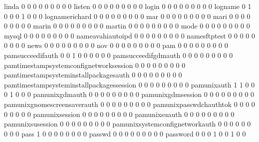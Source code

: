 \documentclass[compress,8pt]{beamer}
\begin{document}
\begin{frame}
\begin{Schunk}
  linda                                      0   0   0   0   0   0   0   0   0
  listen                                     0   0   0   0   0   0   0   0   0
  login                                      0   0   0   0   0   0   0   0   0
  logname                                    0   1   0   0   0   1   0   0   0
  lognamerichard                             0   0   0   0   0   0   0   0   0
  mar                                        0   0   0   0   0   0   0   0   0
  mari                                       0   0   0   0   0   0   0   0   0
  marin                                      0   0   0   0   0   0   0   0   0
  martin                                     0   0   0   0   0   0   0   0   0
  mode                                       0   0   0   0   0   0   0   0   0
  mysql                                      0   0   0   0   0   0   0   0   0
  nameavahiautoipd                           0   0   0   0   0   0   0   0   0
  namesftptest                               0   0   0   0   0   0   0   0   0
  news                                       0   0   0   0   0   0   0   0   0
  nov                                        0   0   0   0   0   0   0   0   0
  pam                                        0   0   0   0   0   0   0   0   0
  pamsucceedifauth                           0   0   1   0   0   0   0   0   0
  pamsucceedifgdmauth                        0   0   0   0   0   0   0   0   0
  pamtimestampsystemconfignetworksession     0   0   0   0   0   0   0   0   0
  pamtimestampsysteminstallpackagesauth      0   0   0   0   0   0   0   0   0
  pamtimestampsysteminstallpackagessession   0   0   0   0   0   0   0   0   0
  pamunixauth                                1   1   0   0   0   1   0   0   0
  pamunixgdmauth                             0   0   0   0   0   0   0   0   0
  pamunixgdmsession                          0   0   0   0   0   0   0   0   0
  pamunixgnomescreensaverauth                0   0   0   0   0   0   0   0   0
  pamunixpasswdchauthtok                     0   0   0   0   0   0   0   0   0
  pamunixsession                             0   0   0   0   0   0   0   0   0
  pamunixsuauth                              0   0   0   0   0   0   0   0   0
  pamunixsusession                           0   0   0   0   0   0   0   0   0
  pamunixsystemconfignetworkauth             0   0   0   0   0   0   0   0   0
  pass                                       1   0   0   0   0   0   0   0   0
  passwd                                     0   0   0   0   0   0   0   0   0
  password                                   0   0   0   1   0   0   1   0   0

\end{Schunk}
\end{frame}
\end{document}
